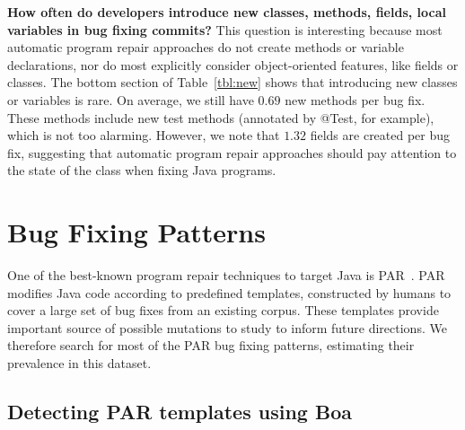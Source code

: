 \documentclass{sig-alternate-05-2015}
\begin{document}
\vspace{1ex}
\noindent\textbf{How often do developers introduce new classes, methods, fields,
	local variables in
bug fixing commits?} 
%
This question is interesting because most automatic program repair approaches
do not create methods or variable declarations, nor do most explicitly consider
object-oriented features, like fields or classes. 
%
The bottom section of Table~\ref{tbl:new} shows that introducing new
classes or variables is rare. On average, we still have $0.69$ new methods
per bug fix. These methods include new test methods (annotated by
@Test, for example), which is not too alarming. However, we note
that $1.32$ fields are created per bug fix, suggesting
that automatic program repair approaches should pay attention to the state of
the class when fixing Java programs.


\section{Bug Fixing Patterns}\label{sec:method}

One of the best-known program repair techniques to target Java is
PAR~\cite{kim2013}.  PAR
modifies Java code according to predefined templates, constructed by humans
to cover a large set of bug fixes from an existing corpus.  These templates provide
important source of possible 
mutations to study to inform future directions. 
We therefore search for most of the PAR bug fixing patterns,
estimating their prevalence in this
dataset.


\subsection{Detecting PAR templates using Boa}
\end{document}
